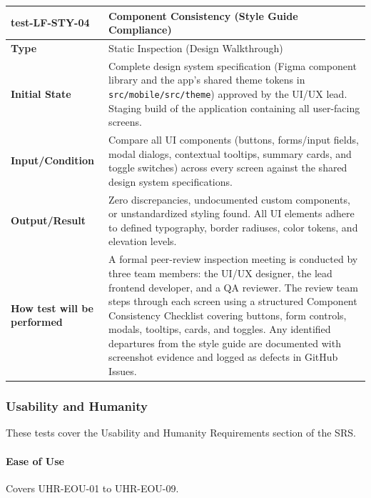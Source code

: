 \documentclass[12pt, titlepage]{article}
\begin{document}
\noindent\begin{tabularx}{\textwidth}{>{\raggedright\arraybackslash}p{3.5cm}X}
  \toprule
  \textbf{test-LF-STY-04}\label{test:LF-STY-04} & \textbf{Component Consistency (Style Guide Compliance)}\\
  \midrule
  \textbf{Type} & Static Inspection (Design Walkthrough)\\
  \textbf{Initial State} & Complete design system specification (Figma component library and the app's shared theme tokens in \texttt{src/mobile/src/theme}) approved by the UI/UX lead. Staging build of the application containing all user-facing screens.\\
  \textbf{Input/Condition} & Compare all UI components (buttons, forms/input fields, modal dialogs, contextual tooltips, summary cards, and toggle switches) across every screen against the shared design system specifications.\\
  \textbf{Output/Result} & Zero discrepancies, undocumented custom components, or unstandardized styling found. All UI elements adhere to defined typography, border radiuses, color tokens, and elevation levels.\\
  \textbf{How test will be performed} & A formal peer-review inspection meeting is conducted by three team members: the UI/UX designer, the lead frontend developer, and a QA reviewer. The review team steps through each screen using a structured Component Consistency Checklist covering buttons, form controls, modals, tooltips, cards, and toggles. Any identified departures from the style guide are documented with screenshot evidence and logged as defects in GitHub Issues.\\
  \bottomrule
\end{tabularx}

\subsubsection{Usability and Humanity}

These tests cover the Usability and Humanity Requirements section of the SRS.

\paragraph{Ease of Use}

Covers UHR-EOU-01 to UHR-EOU-09.
\end{document}
